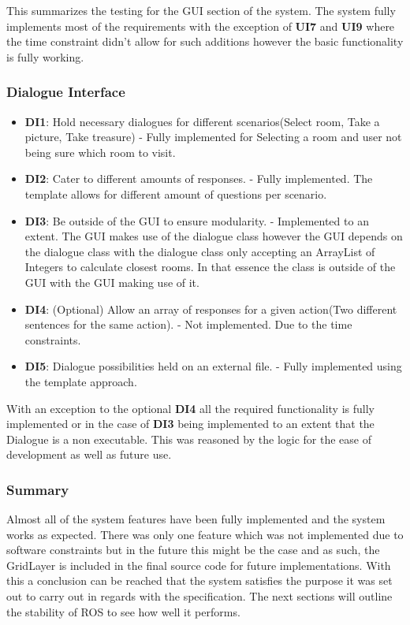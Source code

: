         This summarizes the testing for the GUI section of the system. The system fully implements most of the requirements with the exception of \textbf{UI7} and \textbf{UI9} where the time constraint didn't allow for such additions however the basic functionality is fully working.

      \subsubsection{Dialogue Interface}
        \begin{itemize}
          \item \textbf{DI1}: Hold necessary dialogues for different scenarios(Select room, Take a picture, Take treasure) - Fully implemented for Selecting a room and user not being sure which room to visit.
          \item \textbf{DI2}: Cater to different amounts of responses. - Fully implemented. The template allows for different amount of questions per scenario.
          \item \textbf{DI3}: Be outside of the GUI to ensure modularity. - Implemented to an extent. The GUI makes use of the dialogue class however the GUI depends on the dialogue class with the dialogue class only accepting an ArrayList of Integers to calculate closest rooms. In that essence the class is outside of the GUI with the GUI making use of it.
          \item \textbf{DI4}: (Optional) Allow an array of responses for a given action(Two different sentences for the same action). - Not implemented. Due to the time constraints.
          \item \textbf{DI5}: Dialogue possibilities held on an external file. - Fully implemented using the template approach.
        \end{itemize}

        With an exception to the optional \textbf{DI4} all the required functionality is fully implemented or in the case of \textbf{DI3} being implemented to an extent that the Dialogue is a non executable. This was reasoned by the logic for the ease of development as well as future use.

      \subsubsection{Summary}
        Almost all of the system features have been fully implemented and the system works as expected. There was only one feature which was not implemented due to software constraints but in the future this might be the case and as such, the GridLayer is included in the final source code for future implementations. With this a conclusion can be reached that the system satisfies the purpose it was set out to carry out in regards with the specification. The next sections will outline the stability of ROS to see how well it performs.

